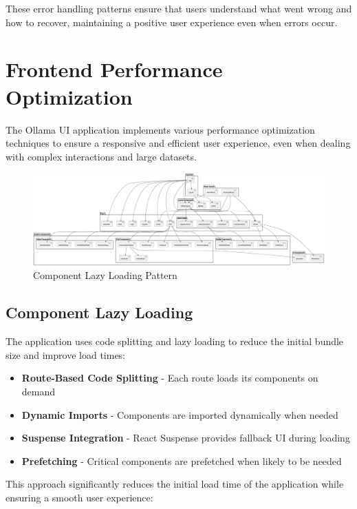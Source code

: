These error handling patterns ensure that users understand what went wrong and how to recover, maintaining a positive user experience even when errors occur.

\section{Frontend Performance Optimization}

The Ollama UI application implements various performance optimization techniques to ensure a responsive and efficient user experience, even when dealing with complex interactions and large datasets.

\begin{figure}
    \centering
    \includegraphics[width=\textwidth]{./Chapter07/figures/component_lazy_loading.PDF}
    \caption{Component Lazy Loading Pattern}
    \label{fig:component-lazy-loading}
\end{figure}
\clearpage

\subsection{Component Lazy Loading}

The application uses code splitting and lazy loading to reduce the initial bundle size and improve load times:

\begin{itemize}
  \item \textbf{Route-Based Code Splitting} - Each route loads its components on demand
  \item \textbf{Dynamic Imports} - Components are imported dynamically when needed
  \item \textbf{Suspense Integration} - React Suspense provides fallback UI during loading
  \item \textbf{Prefetching} - Critical components are prefetched when likely to be needed
\end{itemize}

This approach significantly reduces the initial load time of the application while ensuring a smooth user experience:

